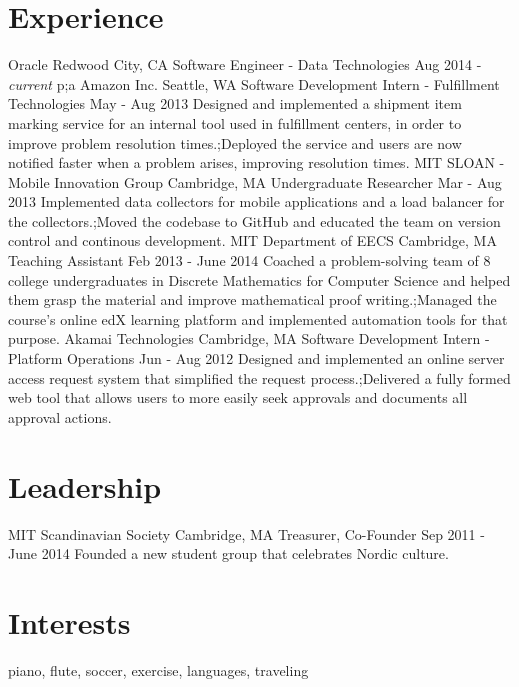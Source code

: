 \documentclass[]{friggeri-cv}
\begin{document}
\section{Experience}

\begin{entrylist}
  \expentry
    {Oracle}
    {Redwood City, CA}
    {Software Engineer - Data Technologies}
    {Aug 2014 - \textit{current}}
    {p;a}
  \expentry
    {Amazon Inc.}
    {Seattle, WA}
    {Software Development Intern - Fulfillment Technologies}
    {May - Aug 2013}
    {Designed and implemented a shipment item marking service for an internal tool used in fulfillment centers, in order to improve problem resolution times.;Deployed the service and users are now notified faster when a problem arises, improving resolution times.}
  \expentry
    {MIT SLOAN - Mobile Innovation Group}
    {Cambridge, MA}
    {Undergraduate Researcher}
    {Mar - Aug 2013}
    {Implemented data collectors for mobile applications and a load balancer for the collectors.;Moved the codebase to GitHub and educated the team on version control and continous development.}
  \expentry
    {MIT Department of EECS}
    {Cambridge, MA}
    {Teaching Assistant}
    {Feb 2013 - June 2014}
    {Coached a problem-solving team of 8 college undergraduates in Discrete Mathematics for Computer Science and helped them grasp the material and improve mathematical proof writing.;Managed the course’s online edX learning platform and implemented automation tools for that purpose.}
  \expentry
    {Akamai Technologies}
    {Cambridge, MA}
    {Software Development Intern - Platform Operations}
    {Jun - Aug 2012}
    {Designed and implemented an online server access request system that simplified the request process.;Delivered a fully formed web tool that allows users to more easily seek approvals and documents all approval actions.}
\end{entrylist}

\section{Leadership}
\begin{entrylist}
  \expentry
    {MIT Scandinavian Society}
    {Cambridge, MA}
    {Treasurer, Co-Founder}
    {Sep 2011 - June 2014}
    {Founded a new student group that celebrates Nordic culture.}
\end{entrylist}

\section{Interests}
    piano, flute, soccer, exercise, languages, traveling
\end{document}
